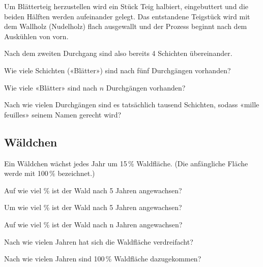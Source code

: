 Um Blätterteig herzustellen wird ein Stück Teig halbiert, eingebuttert
und die beiden Hälften werden aufeinander gelegt. Das entstandene
Teigstück wird mit dem Wallholz (Nudelholz) flach ausgewallt und der
Prozess beginnt nach dem Auskühlen von vorn.

Nach dem zweiten Durchgang sind also bereits 4 Schichten übereinander.

\begin{bbwAufgabenBlock}
\item Wie viele Schichten («Blätter») sind nach fünf Durchgängen
vorhanden?  

\item Wie viele «Blätter» sind nach $n$ Durchgängen
vorhanden?  \noTRAINER{\seitenUmbruchImAufgabenteil{}}

\item Nach wie vielen Durchgängen sind es tatsächlich tausend
Schichten, sodass «mille feuilles» seinem Namen gerecht
wird? 

\end{bbwAufgabenBlock}

\platzFuerBerechnungenBisEndeSeite{}
\TRAINER{\newpage}
\subsection{Wäldchen}
Ein Wäldchen wächst jedes Jahr um 15\,\% Waldfläche. (Die anfängliche Fläche werde mit
100\,\% bezeichnet.)
\begin{bbwAufgabenBlock}
\item Auf wie viel \% ist der Wald nach 5 Jahren angewachsen?  
\item Um wie viel \% ist der Wald nach 5 Jahren angewachsen?  \noTRAINER{\seitenUmbruchImAufgabenteil{}}
\item Auf wie viel \% ist der Wald nach n Jahren
angewachsen?   %
\item Nach wie vielen Jahren hat sich die Waldfläche
verdreifacht?  \noTRAINER{\seitenUmbruchImAufgabenteil{}}
\item Nach wie vielen Jahren sind 100\,\% Waldfläche
dazugekommen?  
\end{bbwAufgabenBlock}

\platzFuerBerechnungenBisEndeSeite{}

